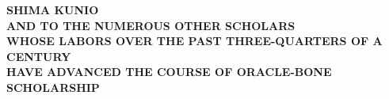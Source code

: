 
\thispagestyle{empty}
\begin{center}
    \vspace*{\fill}
    {\large\bfseries SHIMA KUNIO}\\[1.5\baselineskip]
    {\large\bfseries AND TO THE NUMEROUS OTHER SCHOLARS}\\
    {\large\bfseries WHOSE LABORS OVER THE PAST THREE-QUARTERS OF A CENTURY}\\
    {\large\bfseries HAVE ADVANCED THE COURSE OF ORACLE-BONE SCHOLARSHIP}
    \vspace*{\fill}
\end{center}
\clearpage
